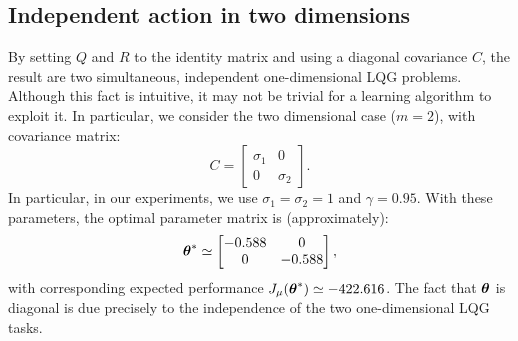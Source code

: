 \subsection{Independent action in two dimensions}
By setting $Q$ and $R$ to the identity matrix and using a diagonal covariance $C$, the result are two simultaneous, independent one-dimensional \ac{LQG} problems. Although this fact is intuitive, it may not be trivial for a learning algorithm to exploit it. In particular, we consider the two dimensional case ($m=2$), with covariance matrix:
\[
	C = 
	\begin{bmatrix}
	\sigma_1 & 0 		\\
	0		 & \sigma_2
	\end{bmatrix}.
\]
In particular, in our experiments, we use $\sigma_1 = \sigma_2 = 1$ and $\gamma = 0.95$. With these parameters, the optimal parameter matrix is (approximately):
\[
	\boldsymbol{\theta}^* \simeq 
	\begin{bmatrix}
	-0.588 & 0 		\\
	0		 & -0.588
	\end{bmatrix},
\]
with corresponding expected performance $J_\mu(\boldsymbol{\theta}^*) \simeq -422.616$. The fact that $\boldsymbol{\theta}$ is diagonal is due precisely to the independence of the two one-dimensional \ac{LQG} tasks.
